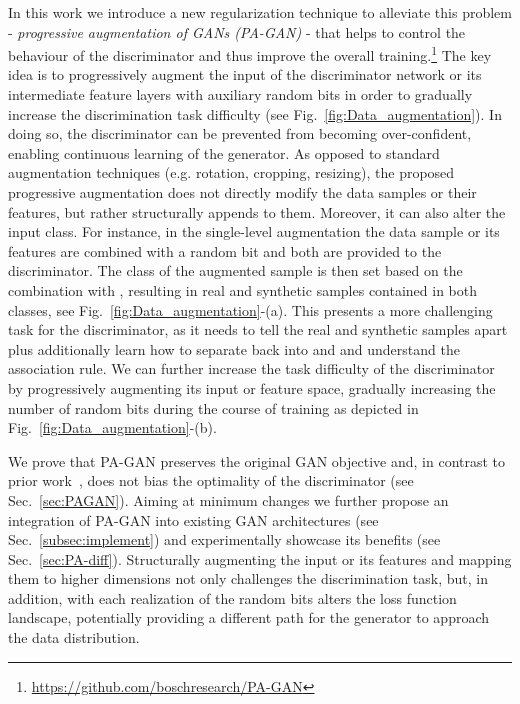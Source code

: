 \documentclass{article}
\begin{document}
In this work we introduce a new regularization technique to alleviate this problem  - \emph{progressive augmentation of GANs (PA-GAN)} - that helps to control the behaviour of the discriminator and thus improve the overall training.\footnote{\url{https://github.com/boschresearch/PA-GAN}} The key idea is to progressively augment the input of the discriminator network or its intermediate feature layers with auxiliary random bits in order to gradually increase the discrimination task difficulty (see Fig.~\ref{fig:Data_augmentation}). In doing so, the discriminator can be prevented from becoming over-confident, enabling continuous learning of the generator. As opposed to standard augmentation techniques (e.g. rotation, cropping, resizing), the proposed progressive augmentation does not directly modify the data samples or their features, but rather structurally appends to them. Moreover, it can also alter the input class. For instance, in the single-level augmentation the data sample or its features  are combined with a random bit  and both are provided to the discriminator. The class of the augmented sample  is then set based on the combination  with , resulting in real and synthetic samples contained in both classes, see Fig.~\ref{fig:Data_augmentation}-(a). This presents a more challenging task for the discriminator, as it needs to tell the real and synthetic samples apart plus additionally learn how to separate  back into  and  and understand the association rule. We can further increase the task difficulty of the discriminator by progressively augmenting its input or feature space, gradually increasing the number of random bits during the course of training as depicted in Fig.~\ref{fig:Data_augmentation}-(b).

We prove that PA-GAN preserves the original GAN objective and, in contrast to prior work~\cite{Arjovsky2017TowardsPM,Sonderby2016AmortisedMI,SalimansNIPS2016}, does not bias the optimality of the discriminator (see Sec.~\ref{sec:PAGAN}). Aiming at minimum changes we further propose an integration of PA-GAN into existing GAN architectures (see Sec.~\ref{subsec:implement}) and experimentally showcase its benefits (see Sec.~\ref{sec:PA-diff}). Structurally augmenting the input or its features and mapping them to higher dimensions not only challenges the discrimination task, but, in addition, with each realization of the random bits alters the loss function landscape, potentially providing a different path for the generator to approach the data distribution.
\end{document}
